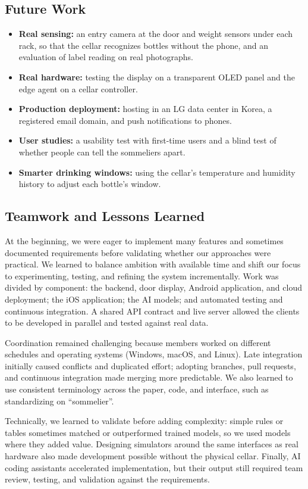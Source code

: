 \documentclass[conference]{IEEEtran}
\begin{document}
\subsection{Future Work}
\begin{itemize}
    \item \textbf{Real sensing:} an entry camera at the door and weight sensors under each rack, so that the cellar recognizes bottles without the phone, and an evaluation of label reading on real photographs.
    \item \textbf{Real hardware:} testing the display on a transparent OLED panel and the edge agent on a cellar controller.
    \item \textbf{Production deployment:} hosting in an LG data center in Korea, a registered email domain, and push notifications to phones.
    \item \textbf{User studies:} a usability test with first-time users and a blind test of whether people can tell the sommeliers apart.
    \item \textbf{Smarter drinking windows:} using the cellar's temperature and humidity history to adjust each bottle's window.
\end{itemize}

\subsection{Teamwork and Lessons Learned}
At the beginning, we were eager to implement many features and sometimes documented requirements before validating whether our approaches were practical. We learned to balance ambition with available time and shift our focus to experimenting, testing, and refining the system incrementally. Work was divided by component: the backend, door display, Android application, and cloud deployment; the iOS application; the AI models; and automated testing and continuous integration. A shared API contract and live server allowed the clients to be developed in parallel and tested against real data.

Coordination remained challenging because members worked on different schedules and operating systems (Windows, macOS, and Linux). Late integration initially caused conflicts and duplicated effort; adopting branches, pull requests, and continuous integration made merging more predictable. We also learned to use consistent terminology across the paper, code, and interface, such as standardizing on ``sommelier''.

Technically, we learned to validate before adding complexity: simple rules or tables sometimes matched or outperformed trained models, so we used models where they added value. Designing simulators around the same interfaces as real hardware also made development possible without the physical cellar. Finally, AI coding assistants accelerated implementation, but their output still required team review, testing, and validation against the requirements.
\end{document}
